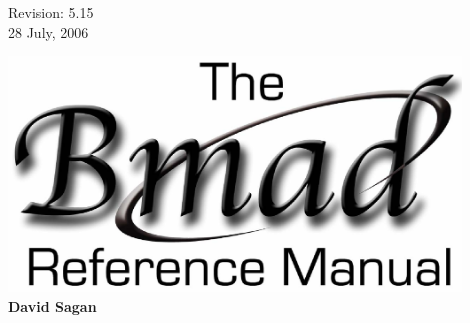 \thispagestyle{empty}

\begin{flushright}
\large
  Revision: 5.15 \\
  28 July, 2006 \\
\end{flushright}

\vfill

{
\begin{center}
\includegraphics[width=12cm]{bmad_ref_manual.eps} \\
\vskip 0.3in
\huge\bf David Sagan
\end{center}
}

\vfill
\break
